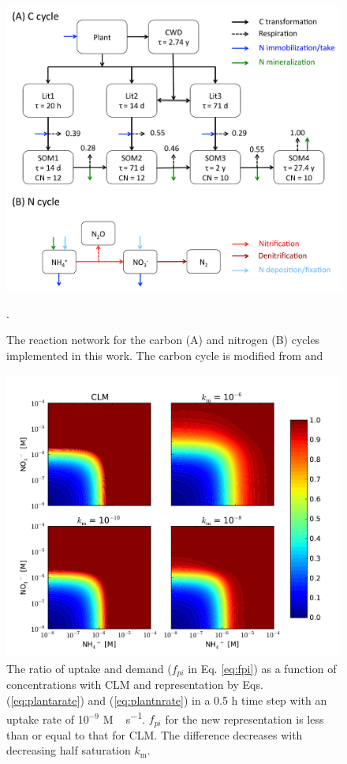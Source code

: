 \documentclass[gmd, manuscript]{copernicus}
\begin{document}
\clearpage
\begin{figure}[t]
\includegraphics[width=15cm]{../figs/fig01/fig01conceptualmodel.pdf}
\caption{The reaction network for the carbon (A) and nitrogen (B) cycles implemented in this work. The carbon cycle is modified from \citet{Thornton2005} and \citet{Bonan2012}}.
\label{fig:conceptualmodel}
\end{figure}

\begin{figure}[t]
\includegraphics[width=12cm]{../figs/fig05/uptakef.pdf}
\caption{The ratio of uptake and demand ($f_{pi}$ in Eq. \ref{eq:fpi}) as a
function of concentrations with CLM and representation by Eqs.
(\ref{eq:plantarate}) and (\ref{eq:plantnrate}) in a 0.5 h time step with an
uptake rate of 10$^{-9}$ \unit{M\,s^{-1}}. $f_{pi}$ for the new representation
is less than or equal to that for CLM. The difference decreases with decreasing
half saturation $k_\text{m}$.}
\label{fig:demanddistribution}
\end{figure}
\end{document}
